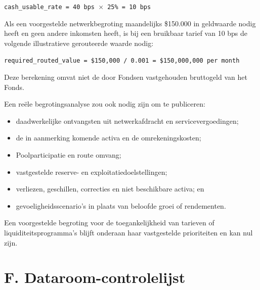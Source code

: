 \documentclass[11pt]{article}
\begin{document}
\texttt{cash\_usable\_rate = 40 bps $\times$ 25\% = 10 bps}

Als een voorgestelde netwerkbegroting maandelijks \$150.000 in geldwaarde nodig heeft en geen andere inkomsten heeft, is bij een bruikbaar tarief van 10 bps de volgende illustratieve gerouteerde waarde nodig:

\texttt{required\_routed\_value = \$150,000 / 0.001 = \$150,000,000 per month}

Deze berekening omvat niet de door Fondsen vastgehouden bruttogeld van het Fonds.

Een reële begrotingsanalyse zou ook nodig zijn om te publiceren:

\begin{itemize}[leftmargin=*]
\item daadwerkelijke ontvangsten uit netwerkafdracht en servicevergoedingen;
\item de in aanmerking komende activa en de omrekeningskosten;
\item Poolparticipatie en route omvang;
\item vastgestelde reserve- en exploitatiedoelstellingen;
\item verliezen, geschillen, correcties en niet beschikbare activa; en
\item gevoeligheidsscenario's in plaats van beloofde groei of rendementen.
\end{itemize}
Een voorgestelde begroting voor de toegankelijkheid van tarieven of liquiditeitsprogramma's blijft onderaan haar vastgestelde prioriteiten en kan nul zijn.


\section*{F. Dataroom-controlelijst}
\end{document}
